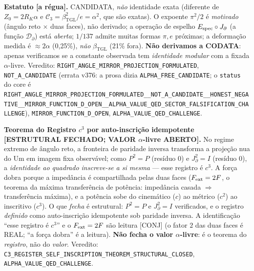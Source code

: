 \documentclass[11pt]{article}
\newcommand{\bTGL}{\beta_{\mathrm{TGL}}}\newcommand{\Msun}{M_{\odot}}\newcommand{\TGL}{\mathrm{TGL}}
\theoremstyle{definition}\newtheorem{deriv}{Derivação}
\begin{document}
\textbf{Estatuto \textsf{[a régua]}.} CANDIDATA, \emph{não} identidade exata (diferente de $Z_0=2R_K\alpha$ e $\mathcal C_3=\bTGL^2/e=\alpha^2$, que são exatas). O expoente $\pi^2/2$ é \emph{motivado} (ângulo reto $\times$ duas faces), não derivado; a operação de espelho $E_{\rm spec}\circ J_\partial$ (a função $\mathcal D_\partial$) está \emph{aberta}; $1/137$ admite muitas formas $\pi,e$ próximas; a deformação medida é $\approx 2\alpha$ (0,25\%), \emph{não} $\bTGL$ (21\% fora). \textbf{Não derivamos a CODATA}: apenas verificamos se a constante observada tem \emph{identidade modular} com a fixada $\alpha$-livre. Veredito: \texttt{RIGHT\_ANGLE\_MIRROR\_PROJECTION\_FORMULATED}, \texttt{NOT\_A\_CANDIDATE} (errata v376: a prosa dizia \texttt{ALPHA\_FREE\_CANDIDATE}; o \texttt{status} do core é \texttt{RIGHT\_ANGLE\_MIRROR\_PROJECTION\_FORMULATED\_\_NOT\_A\_CANDIDATE\_\_HONEST\_NEGATIVE\_\_MIRROR\_FUNCTION\_D\_OPEN\_\_ALPHA\_VALUE\_QED\_SECTOR\_FALSIFICATION\_CHALLENGE}), \texttt{MIRROR\_FUNCTION\_D\_OPEN}, \texttt{ALPHA\_VALUE\_QED\_CHALLENGE}.

\textbf{Teorema do Registro $c^3$ por auto-inscrição idempotente \textsf{[ESTRUTURAL FECHADO; VALOR $\alpha$-livre ABERTO]}.} No regime extremo de ângulo reto, a fronteira de paridade inversa transforma a projeção nua do Um em imagem fixa observável; como $P^2=P$ (resíduo $0$) e $J_\partial^2=I$ (resíduo $0$), a \emph{identidade ao quadrado inscreve-se a si mesma} --- esse registro é $c^3$. A força dobra porque a impedância é compartilhada pelas duas faces ($F_{\rm ext}=2F$, o teorema da máxima transferência de potência: impedância casada $\Rightarrow$ transferência máxima), e a potência sobe do cinemático ($c$) ao métrico ($c^2$) ao inscritivo ($c^3$). O que \emph{fecha} é estrutural: $P^2=P$ e $J_\partial^2=I$ verificados, e o registro \emph{definido} como auto-inscrição idempotente sob paridade inversa. A identificação ``esse registro é $c^3$'' e o $F_{\rm ext}=2F$ são leitura \textsf{[CONJ]} (o fator $2$ das duas faces é REAL; ``a força dobra'' é a leitura). \textbf{Não fecha o valor $\alpha$-livre}: é o teorema do \emph{registro}, não do \emph{valor}. Veredito: \texttt{C3\_REGISTER\_SELF\_INSCRIPTION\_THEOREM\_STRUCTURAL\_CLOSED}, \texttt{ALPHA\_VALUE\_QED\_CHALLENGE}.
\end{document}
